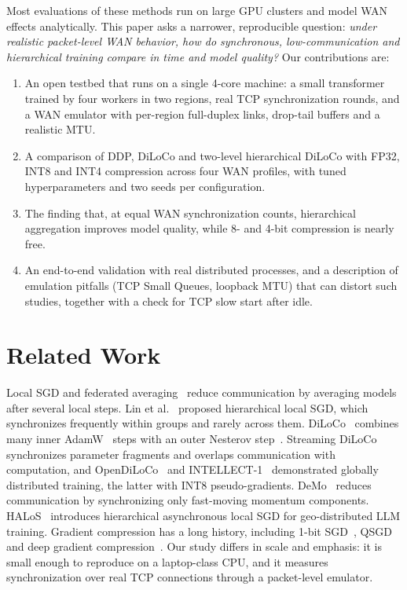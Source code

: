 \documentclass[conference]{IEEEtran}
\begin{document}
Most evaluations of these methods run on large GPU clusters and model WAN effects analytically. This paper asks a narrower, reproducible question: \emph{under realistic packet-level WAN behavior, how do synchronous, low-communication and hierarchical training compare in time and model quality?} Our contributions are:
\begin{enumerate}
\item An open testbed that runs on a single 4-core machine: a small transformer trained by four workers in two regions, real TCP synchronization rounds, and a WAN emulator with per-region full-duplex links, drop-tail buffers and a realistic MTU.
\item A comparison of DDP, DiLoCo and two-level hierarchical DiLoCo with FP32, INT8 and INT4 compression across four WAN profiles, with tuned hyperparameters and two seeds per configuration.
\item The finding that, at equal WAN synchronization counts, hierarchical aggregation improves model quality, while 8- and 4-bit compression is nearly free.
\item An end-to-end validation with real distributed processes, and a description of emulation pitfalls (TCP Small Queues, loopback MTU) that can distort such studies, together with a check for TCP slow start after idle.
\end{enumerate}

\section{Related Work}
Local SGD and federated averaging~\cite{fedavg,stich2019} reduce communication by averaging models after several local steps. Lin et al.~\cite{lin2020} proposed hierarchical local SGD, which synchronizes frequently within groups and rarely across them. DiLoCo~\cite{diloco} combines many inner AdamW~\cite{adamw} steps with an outer Nesterov step~\cite{sutskever2013}. Streaming DiLoCo~\cite{streamingdiloco} synchronizes parameter fragments and overlaps communication with computation, and OpenDiLoCo~\cite{opendiloco} and INTELLECT-1~\cite{intellect1} demonstrated globally distributed training, the latter with INT8 pseudo-gradients. DeMo~\cite{demo} reduces communication by synchronizing only fast-moving momentum components. HALoS~\cite{halos} introduces hierarchical asynchronous local SGD for geo-distributed LLM training. Gradient compression has a long history, including 1-bit SGD~\cite{seide2014}, QSGD~\cite{qsgd} and deep gradient compression~\cite{dgc}. Our study differs in scale and emphasis: it is small enough to reproduce on a laptop-class CPU, and it measures synchronization over real TCP connections through a packet-level emulator.
\end{document}
